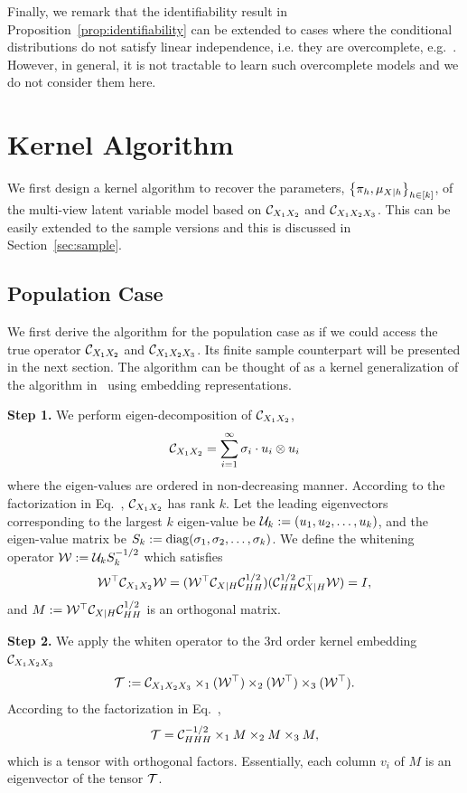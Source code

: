 \documentclass{article}
\begin{document}
Finally, we remark that the identifiability result in Proposition~\ref{prop:identifiability} can be extended to cases where the conditional distributions do not satisfy linear independence, i.e. they are overcomplete, e.g.~\cite{Kruskal:77,DeLathauwerEtal:FOOBI,AnandkumarEtal:overcomplete13}. However, in general, it is not tractable to learn such overcomplete models and we do not consider them here.

\section{Kernel Algorithm}

We first design a kernel algorithm to recover the parameters, $\left\{\pi_h, \mu_{X|h}\right\}_{h \in [k]}$, of the multi-view latent variable model based on $\mathcal{C}_{X_1 X_2}$ and $\mathcal{C}_{X_1 X_2 X_3}$. This can be easily extended to the sample versions and this is discussed in Section~\ref{sec:sample}.
\subsection{Population Case}

We  first derive the algorithm for the population case as if we could access the true operator $\mathcal{C}_{X_1 X_2}$ and $\mathcal{C}_{X_1 X_2 X_3}$. Its finite sample counterpart  will be presented in the next section. The algorithm can be thought of as a kernel generalization of the algorithm in~\cite{AnandkumarEtal:community12} using embedding representations.

{\bf Step 1.} We perform eigen-decomposition of $\mathcal{C}_{X_1 X_2}$,
$$\mathcal{C}_{X_1 X_2} = \sum_{i=1}^{\infty} \sigma_i \cdot u_i \otimes u_i$$
where the eigen-values are ordered in non-decreasing manner.
According to the factorization in Eq.~, $\mathcal{C}_{X_1 X_2}$ has rank $k$.
Let the leading eigenvectors corresponding to the largest $k$ eigen-value be  $\mathcal{U}_k:=(u_1,u_2,\ldots,u_k)$, and the eigen-value matrix be $S_k:=\mathop{\mathrm{diag}}(\sigma_1,\sigma_2,\ldots,\sigma_k)$. We define the whitening operator $\mathcal{W}:= \mathcal{U}_k S_k^{-1/2}$ which satisfies
\begin{align*}
  \mathcal{W}^\top \mathcal{C}_{X_1X_2} \mathcal{W} = (\mathcal{W}^\top \mathcal{C}_{X|H} \mathcal{C}_{HH}^{1/2}) (\mathcal{C}_{HH}^{1/2} \mathcal{C}_{X|H}^\top \mathcal{W}) = I,
\end{align*}
and $M:=\mathcal{W}^\top \mathcal{C}_{X|H} \mathcal{C}_{HH}^{1/2}$ is an orthogonal matrix.

{\bf Step 2.} We apply the whiten operator to the 3rd order kernel embedding $\mathcal{C}_{X_1 X_2 X_3}$
$$
  {\mathcal{T}} := \mathcal{C}_{X_1 X_2 X_3} \times_1 (\mathcal{W}^\top) \times_2 (\mathcal{W}^\top) \times_3 (\mathcal{W}^\top).
$$
According to the factorization in Eq.~,
$$
  {\mathcal{T}} = \mathcal{C}_{HHH}^{-1/2} \times_1 M \times_2 M \times_3 M,
$$
which is a tensor with orthogonal factors. Essentially, each column $v_i$ of $M$ is an eigenvector of the tensor ${\mathcal{T}}$.
\end{document}

